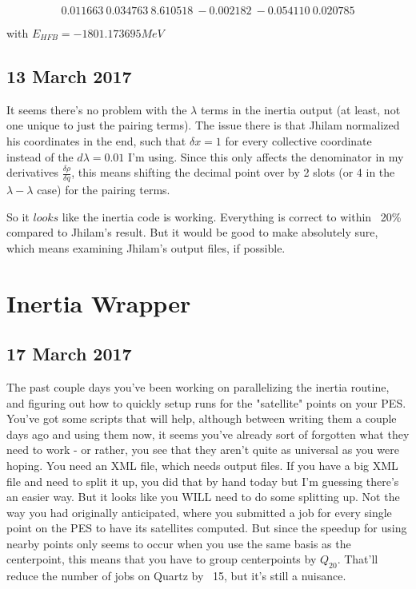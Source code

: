 \documentclass[]{report}
\begin{document}
\begin{equation}
    0.011663\    0.034763\    8.610518\   -0.002182\   -0.054110\    0.020785
\end{equation}

\noindent with $E_{HFB}=-1801.173695 MeV$

\subsection*{13 March 2017}
It seems there's no problem with the $\lambda$ terms in the inertia output (at least, not one unique to just the pairing terms).  The issue there is that Jhilam normalized his coordinates in the end, such that $\delta x=1$ for every collective coordinate instead of the $d\lambda=0.01$ I'm using. Since this only affects the denominator in my derivatives $\frac{\delta \rho}{\delta q}$, this means shifting the decimal point over by 2 slots (or 4 in the $\lambda-\lambda$ case) for the pairing terms.

So it $\mathit{looks}$ like the inertia code is working. Everything is correct to within ~20\% compared to Jhilam's result. But it would be good to make absolutely sure, which means examining Jhilam's output files, if possible. 

\section*{Inertia Wrapper}
\subsection*{17 March 2017}
The past couple days you've been working on parallelizing the inertia routine, and figuring out how to quickly setup runs for the "satellite" points on your PES. You've got some scripts that will help, although between writing them a couple days ago and using them now, it seems you've already sort of forgotten what they need to work - or rather, you see that they aren't quite as universal as you were hoping. You need an XML file, which needs output files. If you have a big XML file and need to split it up, you did that by hand today but I'm guessing there's an easier way. But it looks like you WILL need to do some splitting up. Not the way you had originally anticipated, where you submitted a job for every single point on the PES to have its satellites computed. But since the speedup for using nearby points only seems to occur when you use the same basis as the centerpoint, this means that you have to group centerpoints by $Q_{20}$. That'll reduce the number of jobs on Quartz by ~15, but it's still a nuisance.
\end{document}
